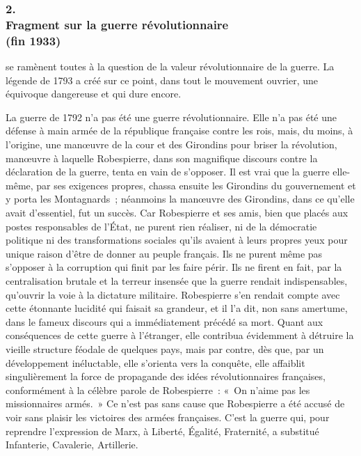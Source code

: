 \documentclass[french,twoside]{book} %
\begin{document}
\subsubsection[2. Fragment sur la guerre révolutionnaire, (fin 1933)]{2. \\
Fragment sur la guerre révolutionnaire \\
(fin 1933)}
\noindent \par
[Ces questions] se ramènent toutes à la question de la valeur révolution­naire de la guerre. La légende de 1793 a créé sur ce point, dans tout le mouvement ouvrier, une équivoque dangereuse et qui dure encore.\par
La guerre de 1792 n'a pas été une guerre révolutionnaire. Elle n'a pas été une défense à main armée de la république française contre les rois, mais, du moins, à l'origine, une manœuvre de la cour et des Girondins pour briser la révolution, manœuvre à laquelle Robespierre, dans son magnifique discours contre la déclaration de la guerre, tenta en vain de s'opposer. Il est vrai que la guerre elle-même, par ses exigences propres, chassa ensuite les Girondins du gouvernement et y porta les Montagnards ; néanmoins la manœuvre des Girondins, dans ce qu'elle avait d'essentiel, fut un succès. Car Robespierre et ses amis, bien que placés aux postes responsables de l'État, ne purent rien réaliser, ni de la démocratie politique ni des transformations sociales qu'ils avaient à leurs propres yeux pour unique raison d'être de donner au peuple français. Ils ne purent même pas s'opposer à la corruption qui finit par les faire périr. Ils ne firent en fait, par la centralisation brutale et la terreur insensée que la guerre rendait indispensables, qu'ouvrir la voie à la dictature militaire. Robespierre s'en rendait compte avec cette étonnante lucidité qui faisait sa grandeur, et il l'a dit, non sans amertume, dans le fameux discours qui a immédiatement précédé sa mort. Quant aux conséquences de cette guerre à l'étranger, elle contribua évidemment à détruire la vieille structure féodale de quelques pays, mais par contre, dès que, par un développement inéluctable, elle s'orienta vers la conquête, elle affaiblit singulièrement la force de propagande des idées révolutionnaires françaises, conformément à la célèbre parole de Robespierre : « On n'aime pas les missionnaires armés. » Ce n'est pas sans cause que Robespierre a été accusé de voir sans plaisir les victoires des armées françaises. C'est la guerre qui, pour reprendre l'expression de Marx, à Liberté, Égalité, Fraternité, a substitué Infanterie, Cavalerie, Artillerie.\par
\end{document}
